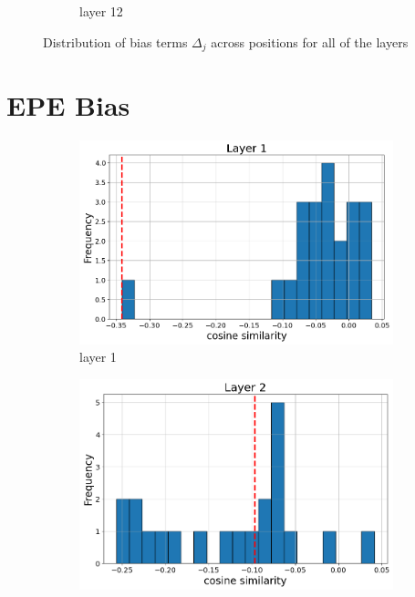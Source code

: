 \documentclass[11pt]{article}
\begin{document}
\begin{figure}[t]
\begin{subfigure}[t]{0.24\textwidth}
    \caption{layer 12}
  \end{subfigure}\hfill
  \vspace{2mm}
  \caption{Distribution of bias terms $\Delta_j$ across positions for all of the layers}
\end{figure}

\section{EPE Bias}\label{app:epe_bias}

\begin{figure}[t]
  \begin{subfigure}[t]{0.24\textwidth}
    \centering
    \includegraphics[width=1.4\columnwidth]{figures/obs2_appendix/obs2_layer1.png}
    \caption{layer 1}
  \end{subfigure}\hfill
  \begin{subfigure}[t]{0.24\textwidth}
    \centering
    \includegraphics[width=1.4\columnwidth]{figures/obs2_appendix/obs2_layer2.png}

\end{subfigure}
\end{figure}
\end{document}
